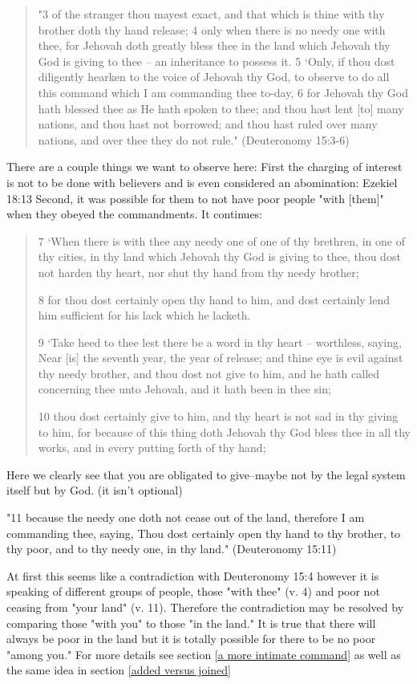 \documentclass[11pt]{article}
\begin{document}
\begin{quote}
"3 of the stranger thou mayest exact, and that which is thine with thy brother doth thy hand release;
4 only when there is no needy one with thee, for Jehovah doth greatly bless thee in the land which Jehovah thy God is giving to thee -- an inheritance to possess it.
5 `Only, if thou dost diligently hearken to the voice of Jehovah thy God, to observe to do all this command which I am commanding thee to-day,
6 for Jehovah thy God hath blessed thee as He hath spoken to thee; and thou hast lent [to] many nations, and thou hast not borrowed; and thou hast ruled over many nations, and over thee they do not rule." (Deuteronomy 15:3-6)
\end{quote}
There are a couple things we want to observe here: First the charging of interest is not to be done with believers and is even considered an abomination: Ezekiel 18:13 Second, it was possible for them to not have poor people "with [them]" when they obeyed the commandments. It continues:
\begin{quote}
7 `When there is with thee any needy one of one of thy brethren, in one of thy cities, in thy land which Jehovah thy God is giving to thee, thou dost not harden thy heart, nor shut thy hand from thy needy brother;

8 for thou dost certainly open thy hand to him, and dost certainly lend him sufficient for his lack which he lacketh.

9 `Take heed to thee lest there be a word in thy heart -- worthless, saying, Near [is] the seventh year, the year of release; and thine eye is evil against thy needy brother, and thou dost not give to him, and he hath called concerning thee unto Jehovah, and it hath been in thee sin;

10 thou dost certainly give to him, and thy heart is not sad in thy giving to him, for because of this thing doth Jehovah thy God bless thee in all thy works, and in every putting forth of thy hand;
\end{quote}

Here we clearly see that you are obligated to give--maybe not by the legal system itself but by God. (it isn't optional)

"11 because the needy one doth not cease out of the land, therefore I am commanding thee, saying, Thou dost certainly open thy hand to thy brother, to thy poor, and to thy needy one, in thy land." (Deuteronomy 15:11)

At first this seems like a contradiction with Deuteronomy 15:4 however it is speaking of different groups of people, those "with thee" (v. 4) and poor not ceasing from "your land" (v. 11). Therefore the contradiction may be resolved by comparing those "with you" to those "in the land." It is true that there will always be poor in the land but it is totally possible for there to be no poor "among you." For more details see section \ref{a more intimate command} as well as the same idea in section \ref{added versus joined}
\end{document}
